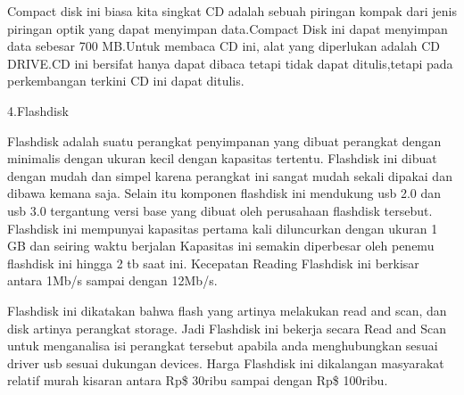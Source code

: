 Compact disk ini biasa kita singkat CD adalah sebuah piringan kompak dari jenis piringan optik yang dapat menyimpan data.Compact Disk ini dapat menyimpan data sebesar 700 MB.Untuk membaca CD ini, alat yang diperlukan adalah CD DRIVE.CD ini bersifat hanya dapat dibaca tetapi tidak dapat ditulis,tetapi pada perkembangan terkini CD ini dapat ditulis.

4.Flashdisk

Flashdisk adalah suatu perangkat penyimpanan yang dibuat perangkat dengan minimalis dengan ukuran kecil dengan kapasitas tertentu. Flashdisk ini dibuat dengan
mudah dan simpel karena perangkat ini sangat mudah sekali dipakai dan dibawa kemana saja. Selain itu komponen flashdisk ini mendukung usb 2.0 dan usb 3.0 tergantung
versi base yang dibuat oleh perusahaan flashdisk tersebut. Flashdisk ini mempunyai kapasitas pertama kali diluncurkan dengan ukuran 1 GB dan seiring waktu berjalan
Kapasitas ini semakin diperbesar oleh penemu flashdisk ini hingga 2 tb saat ini. Kecepatan Reading Flashdisk ini berkisar antara 1Mb/s sampai dengan 12Mb/s.

Flashdisk ini dikatakan bahwa flash yang artinya melakukan read and scan, dan disk artinya perangkat storage. Jadi Flashdisk ini bekerja secara Read and Scan untuk
menganalisa isi perangkat tersebut apabila anda menghubungkan sesuai driver usb sesuai dukungan devices. Harga Flashdisk ini dikalangan masyarakat relatif murah
kisaran antara Rp\$ 30ribu sampai dengan Rp\$ 100ribu.

